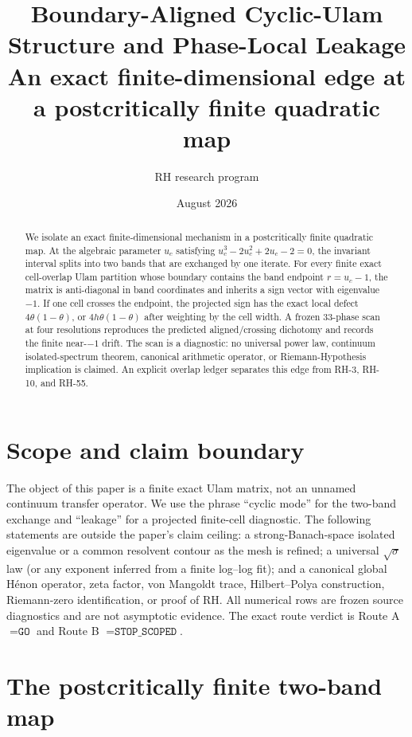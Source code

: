 \documentclass[11pt]{article}
\title{Boundary-Aligned Cyclic-Ulam Structure and Phase-Local Leakage\\
\large An exact finite-dimensional edge at a postcritically finite quadratic map}
\author{RH research program}
\date{August 2026}
\theoremstyle{definition}
\theoremstyle{remark}
\begin{document}
\maketitle

\begin{abstract}
We isolate an exact finite-dimensional mechanism in a postcritically finite
quadratic map.  At the algebraic parameter $u_c$ satisfying
$u_c^3-2u_c^2+2u_c-2=0$, the invariant interval splits into two bands that
are exchanged by one iterate.  For every finite exact cell-overlap Ulam
partition whose boundary contains the band endpoint $r=u_c-1$, the matrix is
anti-diagonal in band coordinates and inherits a sign vector with eigenvalue
$-1$.  If one cell crosses the endpoint, the projected sign has the exact
local defect $4\theta(1-\theta)$, or $4h\theta(1-\theta)$ after weighting by
the cell width.  A frozen 33-phase scan at four resolutions reproduces the
predicted aligned/crossing dichotomy and records the finite near-$-1$ drift.
The scan is a diagnostic: no universal power law, continuum isolated-spectrum
theorem, canonical arithmetic operator, or Riemann-Hypothesis implication is
claimed.  An explicit overlap ledger separates this edge from RH-3, RH-10,
and RH-55.
\end{abstract}

\section{Scope and claim boundary}

The object of this paper is a finite exact Ulam matrix, not an unnamed
continuum transfer operator.  We use the phrase ``cyclic mode'' for the
two-band exchange and ``leakage'' for a projected finite-cell diagnostic.
The following statements are outside the paper's claim ceiling: a
strong-Banach-space isolated eigenvalue or a common resolvent contour as the
mesh is refined; a universal $\sqrt{\sigma}$ law (or any exponent inferred
from a finite log--log fit); and a canonical global H\'enon operator, zeta
factor, von Mangoldt trace, Hilbert--Polya construction, Riemann-zero
identification, or proof of RH.
All numerical rows are frozen source diagnostics and are not asymptotic
evidence.  The exact route verdict is Route A $=\texttt{GO}$ and Route B
$=\texttt{STOP\_SCOPED}$.

\section{The postcritically finite two-band map}
\end{document}
